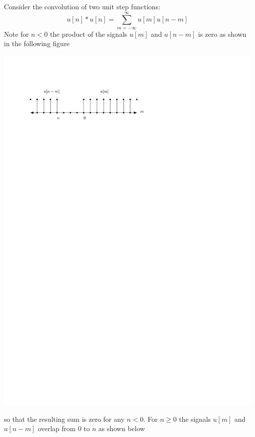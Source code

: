 \begin{example} Consider the convolution of two unit step functions:
  \[
  u[n] * u[n] = \sum\limits_{m = -\infty}^{\infty} u[m]u[n-m]
  \]
  Note for $n < 0$ the product of the signals $u[m]$ and $u[n-m]$ is zero as shown in the following figure
  \begin{center}
  \includegraphics[scale=1]{graphics/dt-step-step-conv.pdf}
  \end{center}
  so that the resulting sum is zero for any $n < 0$. For $n \geq 0$ the signals $u[m]$ and $u[n-m]$ overlap from $0$ to $n$ as shown below
  \begin{center}

\end{center}
\end{example}
